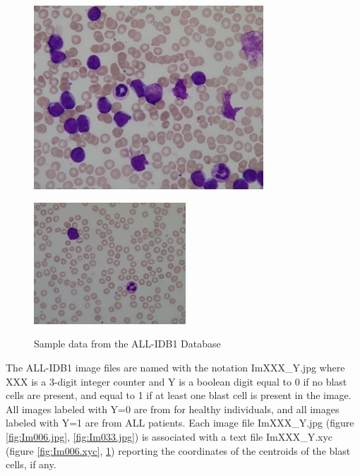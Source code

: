 \begin{figure}[H]
\begin{minipage}[b]{0.35\linewidth}
\centering
\includegraphics{../images/Im006_1.jpg}
\label{fig:Im006.jpg}
\end{minipage}
\hfill
\begin{minipage}[b]{0.3\linewidth}
\centering

\label{fig:Im006.xyc}
\end{minipage}

\begin{minipage}[b]{0.35\linewidth}
\centering
\includegraphics[width=57mm]{../images/Im033_1.jpg}
\label{fig:Im033.jpg}
\end{minipage}
\hfill
\begin{minipage}[b]{0.3\linewidth}
\centering

\label{fig:Im033.xyc}
\end{minipage}
\caption{Sample data from the ALL-IDB1 Database}
\end{figure}

The ALL-IDB1 image files are named with the notation ImXXX\_Y.jpg where XXX is a 3-digit integer counter and Y is a boolean digit equal to 0 if no blast cells are present, and equal to 1 if at least one blast cell is present in the image. All images labeled with Y=0 are from for healthy individuals, and all images labeled with Y=1 are from ALL patients. Each image file ImXXX\_Y.jpg (figure \ref{fig:Im006.jpg}, \ref{fig:Im033.jpg}) is associated with a text file ImXXX\_Y.xyc (figure \ref{fig:Im006.xyc}, \ref{fig:Im033.xyc}) reporting the coordinates of the centroids of the blast cells, if any.\\

